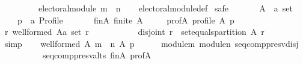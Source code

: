 \begin{isabellebody}
\ \ \ \ \ \ \ \ \ {\isachardoublequoteopen}electoral{\isacharunderscore}{\kern0pt}module\ {\isacharparenleft}{\kern0pt}m\ {\isasymtriangleright}\ n{\isacharparenright}{\kern0pt}{\isachardoublequoteclose}\isanewline
%
\isadelimproof
\ \ %
\endisadelimproof
%
\isatagproof
{}\isamarkupfalse%
\ electoral{\isacharunderscore}{\kern0pt}module{\isacharunderscore}{\kern0pt}def\isanewline
{}\isamarkupfalse%
\ {\isacharparenleft}{\kern0pt}safe{\isacharparenright}{\kern0pt}\isanewline
\ \ \isamarkupfalse%
\isanewline
\ \ \ \ A\ {\isacharcolon}{\kern0pt}{\isacharcolon}{\kern0pt}\ {\isachardoublequoteopen}{\isacharprime}{\kern0pt}a\ set{\isachardoublequoteclose}\ \isanewline
\ \ \ \ p\ {\isacharcolon}{\kern0pt}{\isacharcolon}{\kern0pt}\ {\isachardoublequoteopen}{\isacharprime}{\kern0pt}a\ Profile{\isachardoublequoteclose}\isanewline
\ \ \isamarkupfalse%
\isanewline
\ \ \ \ fin{\isacharunderscore}{\kern0pt}A{\isacharcolon}{\kern0pt}\ {\isachardoublequoteopen}finite\ A{\isachardoublequoteclose}\ \isanewline
\ \ \ \ prof{\isacharunderscore}{\kern0pt}A{\isacharcolon}{\kern0pt}\ {\isachardoublequoteopen}profile\ A\ p{\isachardoublequoteclose}\isanewline
\ \ \isamarkupfalse%
\ {\isachardoublequoteopen}{\isasymforall}r{\isachardot}{\kern0pt}\ well{\isacharunderscore}{\kern0pt}formed\ {\isacharparenleft}{\kern0pt}A{\isacharcolon}{\kern0pt}{\isacharcolon}{\kern0pt}{\isacharprime}{\kern0pt}a\ set{\isacharparenright}{\kern0pt}\ r\ {\isacharequal}{\kern0pt}\isanewline
\ \ \ \ \ \ \ \ \ \ {\isacharparenleft}{\kern0pt}disjoint{}\ r\ {\isasymand}\ set{\isacharunderscore}{\kern0pt}equals{\isacharunderscore}{\kern0pt}partition\ A\ r{\isacharparenright}{\kern0pt}{\isachardoublequoteclose}\isanewline
\ \ \ \ \isamarkupfalse%
\ simp\isanewline
\ \ \isamarkupfalse%
\ {\isachardoublequoteopen}well{\isacharunderscore}{\kern0pt}formed\ A\ {\isacharparenleft}{\kern0pt}{\isacharparenleft}{\kern0pt}m\ {\isasymtriangleright}\ n{\isacharparenright}{\kern0pt}\ A\ p{\isacharparenright}{\kern0pt}{\isachardoublequoteclose}\isanewline
\ \ \ \ \isamarkupfalse%
\ module{\isacharunderscore}{\kern0pt}m\ module{\isacharunderscore}{\kern0pt}n\ seq{\isacharunderscore}{\kern0pt}comp{\isacharunderscore}{\kern0pt}presv{\isacharunderscore}{\kern0pt}disj\isanewline
\ \ \ \ \ \ \ \ \ \ seq{\isacharunderscore}{\kern0pt}comp{\isacharunderscore}{\kern0pt}presv{\isacharunderscore}{\kern0pt}alts\ fin{\isacharunderscore}{\kern0pt}A\ prof{\isacharunderscore}{\kern0pt}A\isanewline

\end{isabellebody}
